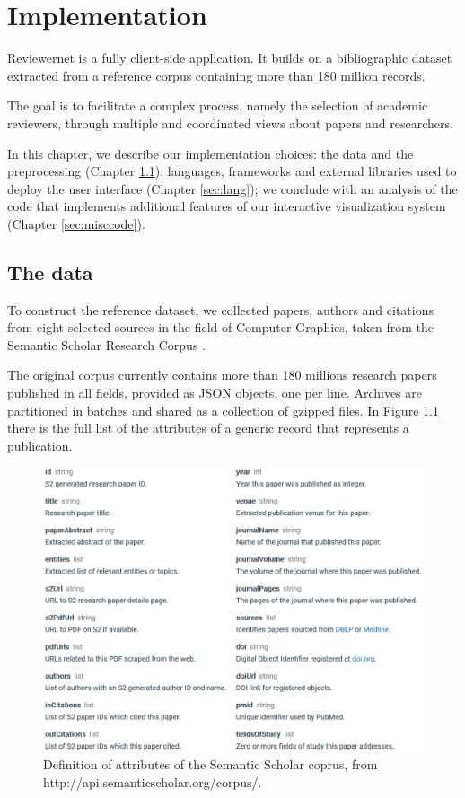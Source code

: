 \chapter{Implementation}
\label{sec:impl}
Reviewernet is a fully client-side application. It builds on a bibliographic dataset extracted from a reference corpus containing more than 180 million records.

The goal is to facilitate a complex process, namely the selection of academic reviewers, through multiple and coordinated views about papers and researchers.

In this chapter, we describe our implementation choices: the data and the preprocessing  (Chapter \ref{sec:data}), languages, frameworks and external libraries used to deploy the user interface (Chapter \ref{sec:lang}); we conclude with an analysis of the code that implements additional features of our interactive visualization system (Chapter \ref{sec:misccode}).
\section{The data}
\label{sec:data}
To construct the reference dataset, we collected papers, authors and citations from eight selected sources in the field of Computer Graphics, taken from the Semantic Scholar Research Corpus \cite{ammar:18}. 

The original corpus currently contains more than 180 millions research papers published in all fields, provided as JSON objects, one per line. Archives are partitioned in batches and shared as a collection of gzipped files. In Figure \ref{jsonfields} there is the full list of the attributes of a generic record that represents a publication.

\begin{figure}[!ht]
    \centering
    \includegraphics[width=\textwidth]{fig/corpusfields.png}
    \caption{Definition of attributes of the Semantic Scholar coprus, from http://api.semanticscholar.org/corpus/. \label{jsonfields}}
\end{figure}

